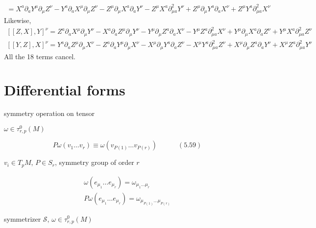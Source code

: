 \documentclass{book}
\begin{document}
\begin{enumerate}
\[\begin{gathered}
  = X^a \partial_a Y^{\mu} \partial_{\mu} Z^{\nu} - Y^a \partial_a X^{\mu} \partial_{\mu} Z^{\nu} - Z^{\mu} \partial_{\mu} X^a \partial_a Y^{\nu} -Z^{\mu}X^a \partial^2_{\mu a} Y^{\nu} + Z^{\mu} \partial_{\mu} Y^a \partial_a X^{\nu} + Z^{\mu} Y^a \partial^2_{\mu a} X^{\nu} 
\end{gathered}
\]
Likewise,
\[
\begin{gathered}
    [[Z,X],Y]^{\nu}    = Z^a \partial_a X^{\mu} \partial_{\mu} Y^{\nu} - X^a \partial_a Z^{\mu} \partial_{\mu} Y^{\nu} - Y^{\mu} \partial_{\mu} Z^a \partial_a X^{\nu} - Y^{\mu} Z^a \partial^2_{\mu a} X^{\nu} + Y^{\mu} \partial_{\mu} X^a \partial_a Z^{\nu} + Y^{\mu} X^a \partial^2_{\mu a} Z^{\nu} \\
    [[Y,Z],X]^{\nu}    = Y^a \partial_a Z^{\mu} \partial_{\mu} X^{\nu} - Z^a \partial_a Y^{\mu} \partial_{\mu} X^{\nu} - X^{\mu} \partial_{\mu} Y^a \partial_a Z^{\nu} - X^{\mu} Y^a \partial^2_{\mu a} Z^{\nu} + X^{\mu} \partial_{\mu} Z^a \partial_a Y^{\nu} + X^{\mu} Z^a \partial^2_{\mu a} Y^{\nu} 
\end{gathered}
\]
All the 18 terms cancel.  

\end{enumerate}






\section{ Differential forms }

symmetry operation on tensor \quad 

$\omega \in \tau^0_{r,p}(M)$

\begin{equation}
P \omega(v_1 \dots v_r) \equiv \omega(v_{P(1)} \dots v_{P(r)} ) \quad \quad \quad (5.59)
\end{equation}

$v_i \in T_p M$, $P \in S_r$, symmetry group of order $r$

\[
\begin{gathered}
  \omega(e_{\mu_1} \dots e_{\mu_r} ) = \omega_{\mu_1 \dots \mu_r} \\
  P\omega(e_{\mu_1} \dots e_{\mu_r} ) = \omega_{ \mu_{P(1)} \dots \mu_{ P(r)}  }
\end{gathered}
\]

symmetrizer $\mathcal{S}$, $\omega \in \tau_{r,p}^0(M)$
\end{document}
